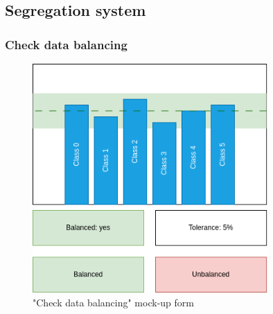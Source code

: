\subsection{Segregation system}

\subsubsection{Check data balancing}

\begin{figure}[H]
\centering
\includegraphics[width=0.8\textwidth]{figures/check_data_balancing.png}
\caption{"Check data balancing" mock-up form}
\end{figure}

